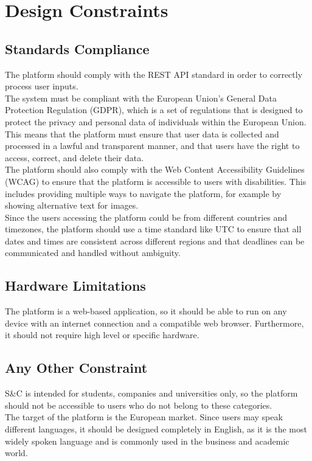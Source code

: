 \section{Design Constraints}

\subsection{Standards Compliance}
The platform should comply with the REST API standard in order to correctly process user inputs. \\
The system must be compliant with the European Union's General Data Protection Regulation (GDPR), which is a set of regulations that is designed
to protect the privacy and personal data of individuals within the European Union. This means that the platform must ensure that user data is
collected and processed in a lawful and transparent manner, and that users have the right to access, correct, and delete their data. \\
The platform should also comply with the Web Content Accessibility Guidelines (WCAG) to ensure that the platform is accessible to users with
disabilities. This includes providing multiple ways to navigate the platform, for example by showing alternative text for images. \\
Since the users accessing the platform could be from different countries and timezones, the platform should use a time standard like UTC to
ensure that all dates and times are consistent across different regions and that deadlines can be communicated and handled without ambiguity.

\subsection{Hardware Limitations}
The platform is a web-based application, so it should be able to run on any device with an internet connection and a compatible web browser. 
Furthermore, it should not require high level or specific hardware.

\subsection{Any Other Constraint}
S\&C is intended for students, companies and universities only, so the platform should not be accessible to users who do not belong to these
categories. \\
The target of the platform is the European market. Since users may speak different languages, it should be designed completely in English, as 
it is the most widely spoken language and is commonly used in the business and academic world.


